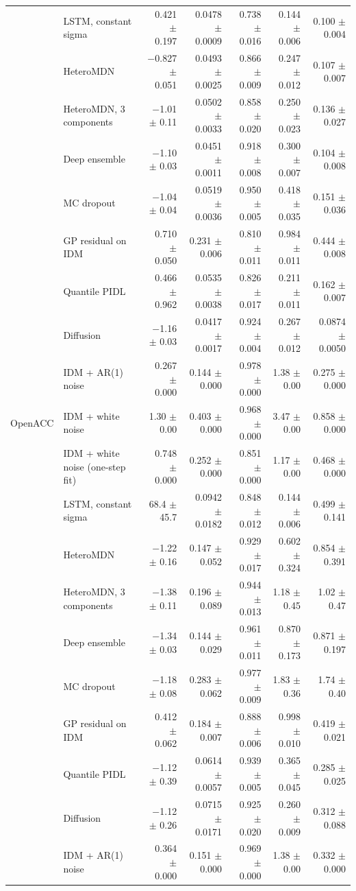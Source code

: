 \begin{longtable}{llrrrrr}
 & LSTM, constant sigma & 0.421 $\pm$ 0.197 & 0.0478 $\pm$ 0.0009 & 0.738 $\pm$ 0.016 & 0.144 $\pm$ 0.006 & 0.100 $\pm$ 0.004 \\
 & HeteroMDN & $-$0.827 $\pm$ 0.051 & 0.0493 $\pm$ 0.0025 & 0.866 $\pm$ 0.009 & 0.247 $\pm$ 0.012 & 0.107 $\pm$ 0.007 \\
 & HeteroMDN, 3 components & $-$1.01 $\pm$ 0.11 & 0.0502 $\pm$ 0.0033 & 0.858 $\pm$ 0.020 & 0.250 $\pm$ 0.023 & 0.136 $\pm$ 0.027 \\
 & Deep ensemble & $-$1.10 $\pm$ 0.03 & 0.0451 $\pm$ 0.0011 & 0.918 $\pm$ 0.008 & 0.300 $\pm$ 0.007 & 0.104 $\pm$ 0.008 \\
 & MC dropout & $-$1.04 $\pm$ 0.04 & 0.0519 $\pm$ 0.0036 & 0.950 $\pm$ 0.005 & 0.418 $\pm$ 0.035 & 0.151 $\pm$ 0.036 \\
 & GP residual on IDM & 0.710 $\pm$ 0.050 & 0.231 $\pm$ 0.006 & 0.810 $\pm$ 0.011 & 0.984 $\pm$ 0.011 & 0.444 $\pm$ 0.008 \\
 & Quantile PIDL & 0.466 $\pm$ 0.962 & 0.0535 $\pm$ 0.0038 & 0.826 $\pm$ 0.017 & 0.211 $\pm$ 0.011 & 0.162 $\pm$ 0.007 \\
 & Diffusion & $-$1.16 $\pm$ 0.03 & 0.0417 $\pm$ 0.0017 & 0.924 $\pm$ 0.004 & 0.267 $\pm$ 0.012 & 0.0874 $\pm$ 0.0050 \\
 & IDM + AR(1) noise & 0.267 $\pm$ 0.000 & 0.144 $\pm$ 0.000 & 0.978 $\pm$ 0.000 & 1.38 $\pm$ 0.00 & 0.275 $\pm$ 0.000 \\
\midrule
OpenACC & IDM + white noise & 1.30 $\pm$ 0.00 & 0.403 $\pm$ 0.000 & 0.968 $\pm$ 0.000 & 3.47 $\pm$ 0.00 & 0.858 $\pm$ 0.000 \\
 & IDM + white noise (one-step fit) & 0.748 $\pm$ 0.000 & 0.252 $\pm$ 0.000 & 0.851 $\pm$ 0.000 & 1.17 $\pm$ 0.00 & 0.468 $\pm$ 0.000 \\
 & LSTM, constant sigma & 68.4 $\pm$ 45.7 & 0.0942 $\pm$ 0.0182 & 0.848 $\pm$ 0.012 & 0.144 $\pm$ 0.006 & 0.499 $\pm$ 0.141 \\
 & HeteroMDN & $-$1.22 $\pm$ 0.16 & 0.147 $\pm$ 0.052 & 0.929 $\pm$ 0.017 & 0.602 $\pm$ 0.324 & 0.854 $\pm$ 0.391 \\
 & HeteroMDN, 3 components & $-$1.38 $\pm$ 0.11 & 0.196 $\pm$ 0.089 & 0.944 $\pm$ 0.013 & 1.18 $\pm$ 0.45 & 1.02 $\pm$ 0.47 \\
 & Deep ensemble & $-$1.34 $\pm$ 0.03 & 0.144 $\pm$ 0.029 & 0.961 $\pm$ 0.011 & 0.870 $\pm$ 0.173 & 0.871 $\pm$ 0.197 \\
 & MC dropout & $-$1.18 $\pm$ 0.08 & 0.283 $\pm$ 0.062 & 0.977 $\pm$ 0.009 & 1.83 $\pm$ 0.36 & 1.74 $\pm$ 0.40 \\
 & GP residual on IDM & 0.412 $\pm$ 0.062 & 0.184 $\pm$ 0.007 & 0.888 $\pm$ 0.006 & 0.998 $\pm$ 0.010 & 0.419 $\pm$ 0.021 \\
 & Quantile PIDL & $-$1.12 $\pm$ 0.39 & 0.0614 $\pm$ 0.0057 & 0.939 $\pm$ 0.005 & 0.365 $\pm$ 0.045 & 0.285 $\pm$ 0.025 \\
 & Diffusion & $-$1.12 $\pm$ 0.26 & 0.0715 $\pm$ 0.0171 & 0.925 $\pm$ 0.020 & 0.260 $\pm$ 0.009 & 0.312 $\pm$ 0.088 \\
 & IDM + AR(1) noise & 0.364 $\pm$ 0.000 & 0.151 $\pm$ 0.000 & 0.969 $\pm$ 0.000 & 1.38 $\pm$ 0.00 & 0.332 $\pm$ 0.000 \\
\end{longtable}
\endgroup
